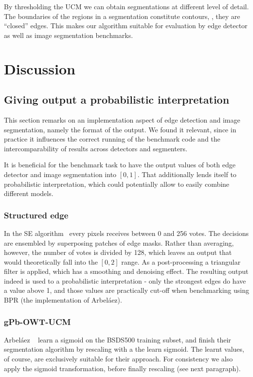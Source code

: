 By thresholding the UCM we can obtain segmentations at different level of detail. The boundaries of the regions in a segmentation constitute contours, \ie, they are ``closed'' edges. This makes our algorithm suitable for evaluation by edge detector as well as image segmentation benchmarks.

\section{Discussion}
\subsection{Giving output a probabilistic interpretation}
This section remarks on an implementation aspect of edge detection and image segmentation, namely the format of the output. We found it relevant, since in practice it influences the correct running of the benchmark code and the intercomparability %
of results across detectors and segmenters.

It is beneficial %
for the benchmark task to have the output values of both edge detector and image segmentation into $[0,1]$. That additionally lends itself to probabilistic interpretation, which could potentially allow to easily combine different models.

\subsubsection{Structured edge}
In the SE algorithm~\cite{DollarICCV13edges,Dollar2015PAMI} every pixels receives between 0 and 256 votes. The decisions are ensembled by superposing patches of edge masks. Rather than averaging, however, the number of votes is divided by 128, which leaves an output that would theoretically fall into the $[0, 2]$ range. As a post-processing a triangular filter is applied, which has a smoothing and denoising effect. The resulting output indeed is used to %
a probabilistic interpretation - only the strongest edges do have a value above 1, and those values are practically cut-off when benchmarking using BPR (the implementation of Arbel\'aez\etal).

\subsubsection{gPb-OWT-UCM}
Arbel\'aez \etal~\cite{Arbelaez11} learn a sigmoid on the BSDS500 training subset, and finish their segmentation algorithm by rescaling with a the learn sigmoid. The learnt values, of course, are exclusively suitable for their approach. For consistency we also apply the sigmoid transformation, before finally rescaling (see next paragraph).

